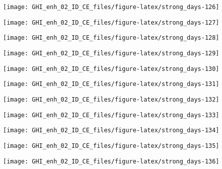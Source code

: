 \documentclass[
  10pt,
  a4paper,oneside]{article}
\begin{document}
\begin{center}\texttt{[image: GHI\_enh\_02\_ID\_CE\_files/figure-latex/strong\_days-126]} \end{center}

\begin{center}\texttt{[image: GHI\_enh\_02\_ID\_CE\_files/figure-latex/strong\_days-127]} \end{center}

\begin{center}\texttt{[image: GHI\_enh\_02\_ID\_CE\_files/figure-latex/strong\_days-128]} \end{center}

\begin{center}\texttt{[image: GHI\_enh\_02\_ID\_CE\_files/figure-latex/strong\_days-129]} \end{center}

\begin{center}\texttt{[image: GHI\_enh\_02\_ID\_CE\_files/figure-latex/strong\_days-130]} \end{center}

\begin{center}\texttt{[image: GHI\_enh\_02\_ID\_CE\_files/figure-latex/strong\_days-131]} \end{center}

\begin{center}\texttt{[image: GHI\_enh\_02\_ID\_CE\_files/figure-latex/strong\_days-132]} \end{center}

\begin{center}\texttt{[image: GHI\_enh\_02\_ID\_CE\_files/figure-latex/strong\_days-133]} \end{center}

\begin{center}\texttt{[image: GHI\_enh\_02\_ID\_CE\_files/figure-latex/strong\_days-134]} \end{center}

\begin{center}\texttt{[image: GHI\_enh\_02\_ID\_CE\_files/figure-latex/strong\_days-135]} \end{center}

\begin{center}\texttt{[image: GHI\_enh\_02\_ID\_CE\_files/figure-latex/strong\_days-136]} \end{center}
\end{document}
